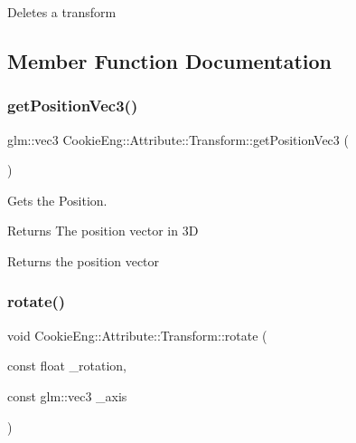 Deletes a transform 

\subsection{Member Function Documentation}
\mbox{\label{class_cookie_eng_1_1_attribute_1_1_transform_a9229397b6dfbf62b3efc904c34d68815}} 
\subsubsection{\texorpdfstring{get\+Position\+Vec3()}{getPositionVec3()}}
{\footnotesize\ttfamily glm\+::vec3 Cookie\+Eng\+::\+Attribute\+::\+Transform\+::get\+Position\+Vec3 (\begin{DoxyParamCaption}{ }\end{DoxyParamCaption})\hspace{0.3cm}{\ttfamily [inline]}}



Gets the Position. 

\begin{DoxyReturn}{Returns}
The position vector in 3D
\end{DoxyReturn}
Returns the position vector \mbox{\label{class_cookie_eng_1_1_attribute_1_1_transform_a8e9c5153f8b338f0fc9d79558d7280c7}} 
\subsubsection{\texorpdfstring{rotate()}{rotate()}}
{\footnotesize\ttfamily void Cookie\+Eng\+::\+Attribute\+::\+Transform\+::rotate (\begin{DoxyParamCaption}\item[{const float}]{\+\_\+rotation,  }\item[{const glm\+::vec3}]{\+\_\+axis }\end{DoxyParamCaption})}



